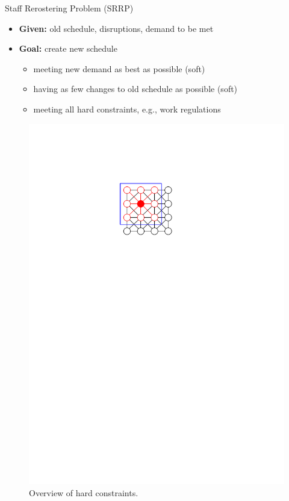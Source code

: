 \documentclass[aspectratio=1610]{beamer}
\newcommand{\important}[1]{{\color{green!60!black}#1}}
\begin{document}
\begin{frame}{Staff Rerostering Problem (SRRP)}
	\begin{itemize}
		\item \textbf{Given:} \important{old schedule, disruptions, demand to be met}
		\item \textbf{Goal:} create new schedule
		\begin{itemize}
			\item meeting new \important{demand} as best as possible (soft)
			\item having as few \important{changes} to old schedule as possible (soft)
			\item meeting all hard constraints, e.g., work regulations
		\end{itemize}
	\end{itemize}
	\begin{figure}
		\centering
		\includegraphics[width=\textwidth, page=7]{graphics/graphics.pdf}
		\caption{Overview of hard constraints.}
	\end{figure}
\end{frame}
\end{document}
